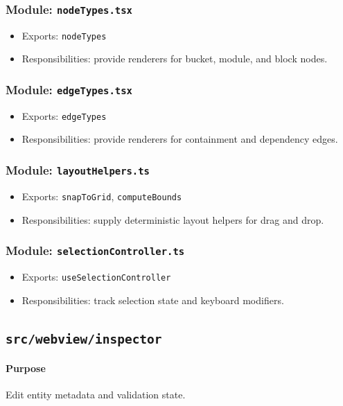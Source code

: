 \documentclass[11pt]{article}
\begin{document}
\subsubsection*{Module: \texttt{nodeTypes.tsx}}
\begin{itemize}[noitemsep]
  \item Exports: \texttt{nodeTypes}
  \item Responsibilities: provide renderers for bucket, module, and block nodes.
\end{itemize}

\subsubsection*{Module: \texttt{edgeTypes.tsx}}
\begin{itemize}[noitemsep]
  \item Exports: \texttt{edgeTypes}
  \item Responsibilities: provide renderers for containment and dependency edges.
\end{itemize}

\subsubsection*{Module: \texttt{layoutHelpers.ts}}
\begin{itemize}[noitemsep]
  \item Exports: \texttt{snapToGrid}, \texttt{computeBounds}
  \item Responsibilities: supply deterministic layout helpers for drag and drop.
\end{itemize}

\subsubsection*{Module: \texttt{selectionController.ts}}
\begin{itemize}[noitemsep]
  \item Exports: \texttt{useSelectionController}
  \item Responsibilities: track selection state and keyboard modifiers.
\end{itemize}

\subsection{\texttt{src/webview/inspector}}
\paragraph{Purpose} Edit entity metadata and validation state.
\end{document}
